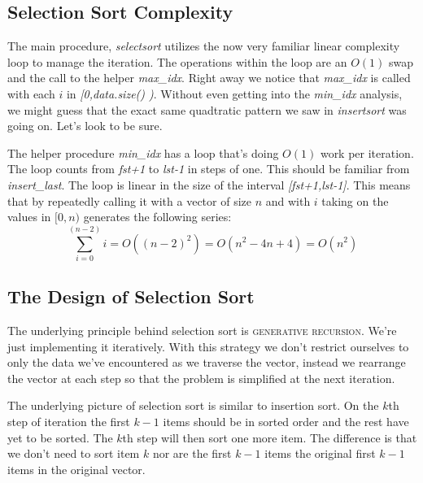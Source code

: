 \documentclass[]{tufte-handout}
\begin{document}
\subsection{Selection Sort Complexity}

The main procedure, \textit{selectsort} utilizes the now very familiar linear complexity loop to manage the iteration. The operations within the loop are an $O(1)$ swap and the call to the helper \textit{max\_idx}. Right away we notice that \textit{max\_idx} is called with each $i$ in \textit{[0,data.size() )}. Without even getting into the \textit{min\_idx} analysis, we might guess that the exact same quadtratic pattern we saw in \textit{insertsort} was going on.  Let's look to be sure.

The helper procedure \textit{min\_idx} has a loop that's doing $O(1)$ work per iteration. The loop counts from \textit{fst+1} to \textit{lst-1} in steps of one. This should be familiar from \textit{insert\_last}. The loop is linear in the size of the interval \textit{[fst+1,lst-1]}. This means that by repeatedly calling it with a vector of size $n$ and with $i$ taking on the values in $[0,n)$ generates the following series:
\[
\sum\limits_{i=0}^{(n-2)} i = O((n-2)^2) = O(n^2-4n+4)=O(n^2)
\]

\subsection{The Design of Selection Sort}

The underlying principle behind selection sort is \textsc{generative recursion}. We're just implementing it iteratively. With this strategy we don't restrict ourselves to only the data we've encountered as we traverse the vector, instead we rearrange the vector at each step so that the problem is simplified at the next iteration. 

The underlying picture of selection sort is similar to insertion sort.  On the $k$th step of iteration the first $k-1$ items should be in sorted order and the rest have yet to be sorted. The $k$th step will then sort one more item. The difference is that we don't need to sort item $k$ nor are the first $k-1$ items the original first $k-1$ items in the original vector.  
\end{document}
